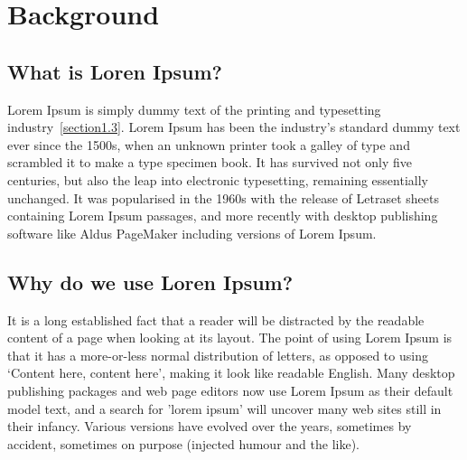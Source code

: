 
\chapter{Background}  %

\section{What is Loren Ipsum?} %

Lorem Ipsum is simply dummy text of the printing and typesetting industry~\cref{section1.3}. Lorem Ipsum\citet{Agn2007} has been the industry's standard dummy text ever since the 1500s, when an unknown printer took a galley of type and scrambled it to make a type specimen book. It has survived not only five centuries, but also the leap into electronic typesetting, remaining essentially unchanged. It was popularised in the 1960s with the release of Letraset sheets containing Lorem Ipsum passages, and more recently with desktop publishing software like Aldus PageMaker including versions of Lorem Ipsum.

\section{Why do we use Loren Ipsum?} %

It is a long established fact that a reader will be distracted by the readable content of a page when looking at its layout. The point of using Lorem Ipsum is that it has a more-or-less normal distribution of letters, as opposed to using `Content here, content here', making it look like readable English. Many desktop publishing packages and web page editors now use Lorem Ipsum as their default model text, and a search for 'lorem ipsum' will uncover many web sites still in their infancy. Various versions have evolved over the years, sometimes by accident, sometimes on purpose (injected humour and the like).

